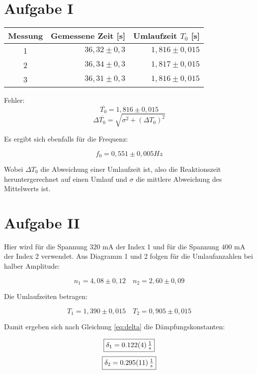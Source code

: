 \section{Aufgabe I}

\begin{table}[h!]
    \centering
    \begin{tabular}{c r r}
        \toprule
        Messung & Gemessene Zeit [s] & Umlaufzeit $T_0$ [s] \\
        \midrule
        1 & $36,32 \pm 0,3$ & $ 1,816 \pm 0,015$ \\
        2 & $36,34 \pm 0,3$ & $ 1,817 \pm 0,015$ \\
        3 & $36,31 \pm 0,3$ & $ 1,816 \pm 0,015$ \\
        \bottomrule
    \end{tabular}
\end{table}
Fehler:
\[\boxed{\overline{T_0} = 1,816 \pm 0,015}\]
\begin{equation}
    \Delta \overline{T_0} = \sqrt{\sigma^2 + (\Delta T_0)^2}
\end{equation}

Es ergibt sich ebenfalls für die Frequenz:

\[\boxed{f_0 = 0,551 \pm 0,005 \si{Hz}}\]

Wobei $\Delta T_0$ die Abweichung einer Umlaufzeit ist, also die Reaktionszeit heruntergerechnet auf einen Umlauf und $\sigma$ die
mittlere Abweichung des Mittelwerts ist.


\section{Aufgabe II}
Hier wird für die Spannung $320$ mA der Index 1 und für die Spannung $400$ mA der Index 2 verwendet. 
Aus Diagramm 1 und 2 folgen für die Umlaufanzahlen bei halber Amplitude:

\[n_1 = 4,08 \pm 0,12\quad n_2 = 2,60 \pm 0,09\]

Die Umlaufzeiten betragen:

\[T_1 = 1,390 \pm 0,015\quad T_2 = 0,905 \pm 0,015\]

Damit ergeben sich nach Gleichung \ref{eq:delta} die Dämpfungskonstanten:

    \[\boxed{\delta_1 = \SI{0,122 \pm 0,004}{\tfrac{1}{\second}}}\notag\]
    \[\boxed{\delta_2 = \SI{0,295 \pm 0,011}{\tfrac{1}{\second}}}\notag\]


